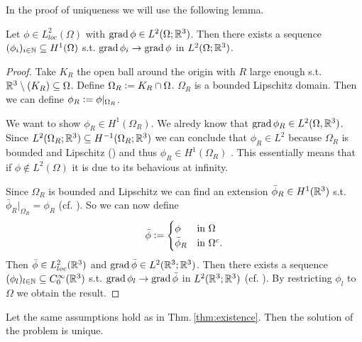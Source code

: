 \documentclass[../master_thesis.tex]{subfiles}
\begin{document}
In the proof of uniqueness we will use the following lemma. 
\begin{lemma}\label{lem:gradient_sequence}
    Let $\phi \in L^2_{loc}(\Omega)$ 
    with $\operatorname{grad} \phi \in L^2(\Omega;\mathbb{R}^3)$. Then 
    there exists a sequence $(\phi_i)_{i \in \mathbb{N}} \subseteq H^1(\Omega)$
    s.t. $\operatorname{grad} \phi_i \rightarrow \operatorname{grad} \phi$ in $L^2(\Omega;\mathbb{R}^3)$.
\end{lemma}
\begin{proof}
    Take $K_R$ the open ball around the origin with $R$ large enough 
    s.t. $\mathbb{R}^3 \setminus (K_R) \subseteq \Omega$. 
    Define $\Omega_R \vcentcolon= K_R \cap \Omega$. $\Omega_R$ is a bounded Lipschitz 
    domain.
    Then we can define $\phi_R \vcentcolon= \phi|_{\Omega_R}$.

    We want to show $\phi_R \in H^1(\Omega_R)$. We alredy know that $\operatorname{grad} \phi_R \in L^2(\Omega, \mathbb{R}^3)$.
    Since $L^2(\Omega_R; \mathbb{R}^3) \subseteq H^{-1}(\Omega_R;\mathbb{R}^3)$ we can conclude that 
    $\phi_R \in L^2$ because $\Omega_R$ is bounded and Lipschitz (\cite[Lemma 3.11]{monk}) 
    and thus $\phi_R \in H^1(\Omega_R)$ . This essentially means that 
    if $\phi \notin L^2(\Omega)$ it is due to its behavious at infinity.

    Since $\Omega_R$ is bounded and Lipschitz we can find an extension $\bar{\phi}_R \in H^1(\mathbb{R}^3)$ 
    s.t. $\bar{\phi}_R|_{\Omega_R} =\phi_R$ (cf. \cite[Sec.\,1.5.1]{mazya}).
    So we can now define
    \begin{align*}
    \bar{\phi} \vcentcolon=
    \begin{cases}
        \phi & \mbox{in $\Omega$}\\
        \bar{\phi}_R & \mbox{in $\Omega^c$.}\\
    \end{cases}
    \end{align*}
    Then $\bar{\phi} \in L^2_{loc}(\mathbb{R}^3)$ and 
    $\operatorname{grad} \bar{\phi} \in L^2(\mathbb{R}^3;\mathbb{R}^3)$. 
    Then there exists a sequence 
    $(\phi_l) _{l \in \mathbb{N}} \subseteq C^\infty_0(\mathbb{R}^3)$ s.t.
    $\operatorname{grad} \phi_l \rightarrow \operatorname{grad} \bar{\phi}$ in $L^2(\mathbb{R}^3;\mathbb{R}^3)$ 
    (cf. \cite[Lemma 1.1]{simader}). By restricting $\phi_l$ to $\Omega$ 
    we obtain the result.
\end{proof}


\begin{theorem}
    Let the same assumptions hold as in Thm.\,\ref{thm:existence}.
    Then the solution of the problem is unique.
\end{theorem}
\end{document}
